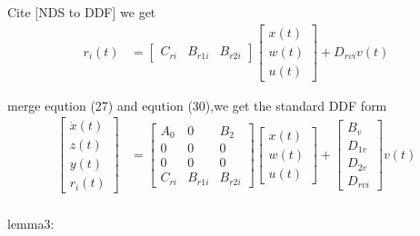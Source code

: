 \documentclass[twocolumn]{autart}    %
\begin{document}
\begin{pf}
    Cite [NDS to DDF] we get
    \begin{equation}
        \begin{aligned}
                r_{i}(t) & = \begin{bmatrix}
                C_{ri} & B_{r1i} & B_{r2i}
            \end{bmatrix}\begin{bmatrix}
                x(t) \\
                w(t) \\
                u(t) 
            \end{bmatrix} 
            + D_{rvi}v(t)
        \end{aligned}
    \end{equation}
    
    merge eqution (27) and eqution (30),we get the standard DDF form
    \begin{equation}
        \begin{aligned}
            \begin{bmatrix}
                \dot{x}(t) \\
                z(t) \\
                y(t) \\
                r_{i}(t)
            \end{bmatrix} & = \begin{bmatrix}
                A_{0} & 0 & B_{2}\\
                0 & 0 & 0\\
                0 & 0 & 0\\
                C_{ri} & B_{r1i} & B_{r2i}
            \end{bmatrix}\begin{bmatrix}
                x(t) \\
                w(t) \\
                u(t) 
            \end{bmatrix} + \begin{bmatrix}
                B_{v} \\
                D_{1v} \\
                D_{2v} \\
                D_{rvi}
            \end{bmatrix}v(t)\\
        \end{aligned}
    \end{equation}

\end{pf}

\begin{pf}
    lemma3:\\

\end{pf}
\end{document}
